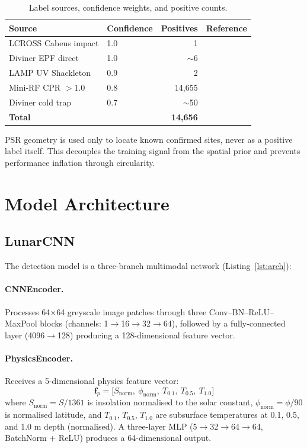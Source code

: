 \documentclass[12pt,a4paper]{article}
\begin{document}
\begin{table}[H]
\centering
\caption{Label sources, confidence weights, and positive counts.}
\label{tab:labels}
\begin{tabular}{llrl}
\toprule
Source & Confidence & Positives & Reference \\
\midrule
LCROSS Cabeus impact    & 1.0 & 1      & \citet{colaprete2010} \\
Diviner EPF direct      & 1.0 & $\sim$6 & \citet{williams2019} \\
LAMP UV Shackleton      & 0.9 & 2      & \citet{gladstone2010} \\
Mini-RF CPR $> 1.0$     & 0.8 & 14{,}655 & \citet{spudis2010}  \\
Diviner cold trap       & 0.7 & $\sim$50 & \citet{paige2010}  \\
\midrule
\textbf{Total}          &     & \textbf{14{,}656} & \\
\bottomrule
\end{tabular}
\end{table}

PSR geometry is used only to locate known confirmed sites, never as a positive
label itself. This decouples the training signal from the spatial prior and
prevents performance inflation through circularity.

\section{Model Architecture}

\subsection{LunarCNN}

The detection model is a three-branch multimodal network (Listing~\ref{lst:arch}):

\paragraph{CNNEncoder.} Processes 64$\times$64 greyscale image patches through
three Conv–BN–ReLU–MaxPool blocks (channels: 1$\to$16$\to$32$\to$64),
followed by a fully-connected layer (4096$\to$128) producing a 128-dimensional feature vector.

\paragraph{PhysicsEncoder.} Receives a 5-dimensional physics feature vector:
\begin{equation}
  \mathbf{f}_p = \bigl[S_\text{norm},\ \phi_\text{norm},\ T_{0.1},\ T_{0.5},\ T_{1.0}\bigr]
\end{equation}
where $S_\text{norm} = S/1361$ is insolation normalised to the solar constant,
$\phi_\text{norm} = \phi/90$ is normalised latitude, and $T_{0.1}$, $T_{0.5}$,
$T_{1.0}$ are subsurface temperatures at 0.1, 0.5, and 1.0 m depth (normalised).
A three-layer MLP (5$\to$32$\to$64$\to$64, BatchNorm + ReLU) produces a
64-dimensional output.
\end{document}
